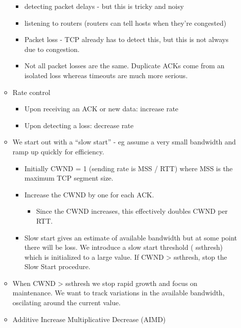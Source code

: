 \begin{itemize}
\begin{itemize}
    \begin{itemize}
    \tightlist
    \item
      detecting packet delays - but this is tricky and noisy
    \item
      listening to routers (routers can tell hosts when they're
      congested)
    \item
      Packet loss - TCP already has to detect this, but this is not
      always due to congestion.
    \item
      Not all packet losses are the same. Duplicate ACKs come from an
      isolated loss whereas timeouts are much more serious.
    \end{itemize}
  \item
    Rate control

    \begin{itemize}
    \tightlist
    \item
      Upon receiving an ACK or new data: increase rate
    \item
      Upon detecting a loss: decrease rate
    \end{itemize}
  \item
    We start out with a ``slow start'' - eg assume a very small
    bandwidth and ramp up quickly for efficiency.

    \begin{itemize}
    \tightlist
    \item
      Initially CWND = 1 (sending rate is MSS / RTT) where MSS is the
      maximum TCP segment size.
    \item
      Increase the CWND by one for each ACK.

      \begin{itemize}
      \tightlist
      \item
        Since the CWND increases, this effectively doubles CWND per RTT.
      \end{itemize}
    \item
      Slow start gives an estimate of available bandwidth but at some
      point there will be loss. We introduce a slow start threshold (
      ssthresh) which is initialized to a large value. If CWND
      \textgreater{} ssthresh, stop the Slow Start procedure.
    \end{itemize}
  \item
    When CWND \textgreater{} ssthresh we stop rapid growth and focus on
    maintenance. We want to track variations in the available bandwidth,
    oscilating around the current value.
  \item
    Additive Increase Multiplicative Decrease (AIMD)


\end{itemize}
\end{itemize}
